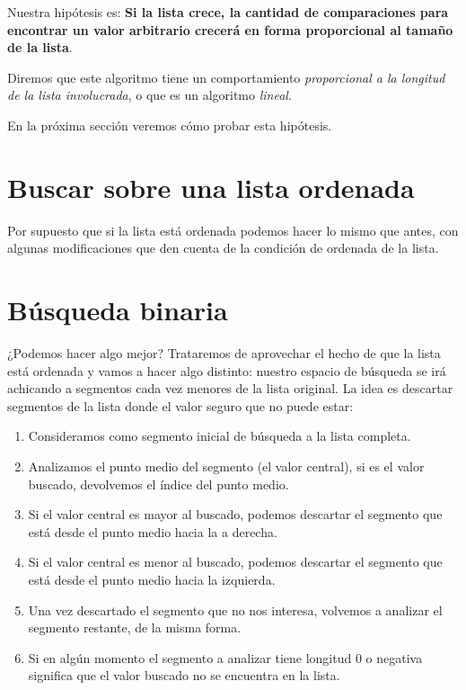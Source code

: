 Nuestra hipótesis es: {\bf Si la lista crece, la cantidad de comparaciones
para encontrar un valor arbitrario crecerá en forma proporcional al tamaño de
la lista}.

Diremos que este algoritmo tiene un comportamiento {\it proporcional a la
longitud de la lista involucrada}, o que es un algoritmo {\it lineal}.

En la próxima sección veremos cómo probar esta hipótesis.

\section{Buscar sobre una lista ordenada}

Por supuesto que si la lista está ordenada podemos hacer lo mismo que antes,
con algunas modificaciones que den cuenta de la condición de ordenada de la
lista.


\section{Búsqueda binaria}

¿Podemos hacer algo mejor? Trataremos de aprovechar el hecho de que la lista
está ordenada y vamos a hacer algo distinto: nuestro espacio de búsqueda se
irá achicando a segmentos cada vez menores de la lista original.
La idea es descartar segmentos de la lista donde el valor seguro que no puede
estar:

\begin{enumerate}
\item Consideramos como segmento inicial de búsqueda a la lista completa.

\item Analizamos el punto medio del segmento (el valor central), si es el valor
buscado, devolvemos el índice del punto medio.

\item Si el valor central es mayor al buscado, podemos descartar el segmento
que está desde el punto medio hacia la a derecha.

\item Si el valor central es menor al buscado, podemos descartar el segmento
que está desde el punto medio hacia la izquierda.

\item Una vez descartado el segmento que no nos interesa, volvemos a analizar
el segmento restante, de la misma forma.

\item Si en algún momento el segmento a analizar tiene longitud 0 o negativa
significa que el valor buscado no se encuentra en la lista.
\end{enumerate}

